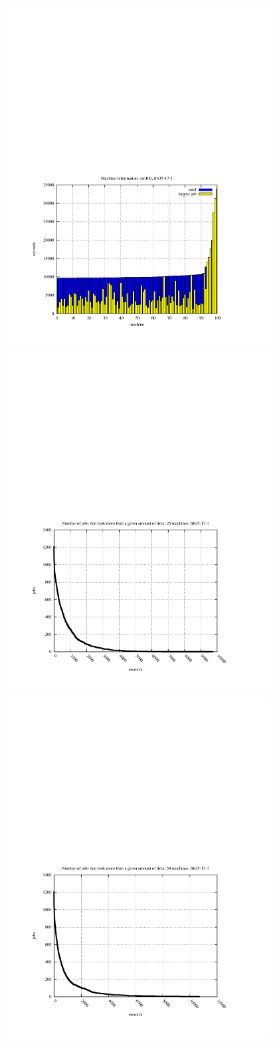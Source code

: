 \documentclass{l4proj}
\begin{document}
\begin{figure}
\begin{center}
\begin{minipage}[t]{0.3\textwidth}
\includegraphics[height=9.0cm]{machInfo-run100-frb35-17-1.pdf}
\end{minipage}
\end{center}
\vspace{-4.0cm}
\begin{center}
\hspace{-1.5cm}
\begin{minipage}[t]{0.3\textwidth}
\includegraphics[height=9.0cm]{jobSizes-run25-frb35-17-1.pdf}
\end{minipage}
\hfill
\begin{minipage}[t]{0.3\textwidth}
\includegraphics[height=9.0cm]{jobSizes-run50-frb35-17-1.pdf}

\end{minipage}
\end{center}
\end{figure}
\end{document}
